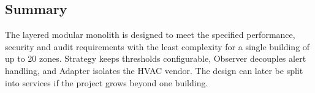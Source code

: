\documentclass[11pt,a4paper]{article}
\begin{document}
\subsection{Summary}
The layered modular monolith is designed to meet the specified performance, security and audit requirements with the least complexity for a single building of up to 20 zones. Strategy keeps thresholds configurable, Observer decouples alert handling, and Adapter isolates the HVAC vendor. The design can later be split into services if the project grows beyond one building.
\end{document}
